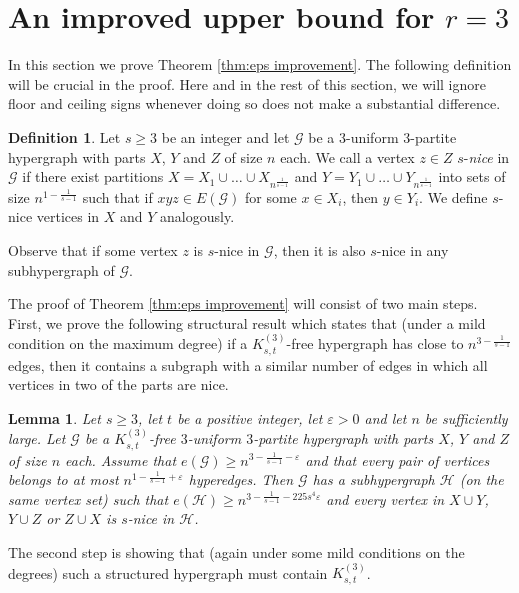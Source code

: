 \documentclass[a4paper,11pt]{article}
\newtheorem{lemma}[theorem]{\bf Lemma}
\theoremstyle{definition}
\newtheorem{definition}[theorem]{\bf Definition}
\def\eps{\varepsilon}
\def\cG{\mathcal{G}}
\def\cH{\mathcal{H}}
\begin{document}
\section{An improved upper bound for $r=3$} \label{sec:improved upper}

In this section we prove Theorem \ref{thm:eps improvement}. The following definition will be crucial in the proof. Here and in the rest of this section, we will ignore floor and ceiling signs whenever doing so does not make a substantial difference.

\begin{definition}
    Let $s\geq 3$ be an integer and let $\cG$ be a 3-uniform 3-partite hypergraph with parts $X$, $Y$ and $Z$ of size $n$ each. We call a vertex $z\in Z$ $s$-\emph{nice} in $\cG$ if there exist partitions $X=X_1\cup \dots \cup X_{n^{\frac{1}{s-1}}}$ and $Y=Y_1\cup \dots \cup Y_{n^{\frac{1}{s-1}}}$ into sets of size $n^{1-\frac{1}{s-1}}$ such that if $xyz\in E(\cG)$ for some $x\in X_i$, then $y\in Y_i$. We define $s$-nice vertices in $X$ and $Y$ analogously.
\end{definition}

Observe that if some vertex $z$ is $s$-nice in $\cG$, then it is also $s$-nice in any subhypergraph of $\cG$.

The proof of Theorem \ref{thm:eps improvement} will consist of two main steps. First, we prove the following structural result which states that (under a mild condition on the maximum degree) if a $K_{s,t}^{(3)}$-free hypergraph has close to $n^{3-\frac{1}{s-1}}$ edges, then it contains a subgraph with a similar number of edges in which all vertices in two of the parts are nice.

\begin{lemma} \label{lem:find structure}
    Let $s\geq 3$, let $t$ be a positive integer, let $\eps>0$ and let $n$ be sufficiently large. Let $\cG$ be a $K_{s,t}^{(3)}$-free $3$-uniform $3$-partite hypergraph with parts $X$, $Y$ and $Z$ of size $n$ each. Assume that $e(\cG)\geq n^{3-\frac{1}{s-1}-\eps}$ and that every pair of vertices belongs to at most $n^{1-\frac{1}{s-1}+\eps}$ hyperedges. Then $\cG$ has a subhypergraph $\cH$ (on the same vertex set) such that $e(\cH)\geq n^{3-\frac{1}{s-1}-225s^4\eps}$ and every vertex in $X\cup Y$, $Y\cup Z$ or $Z\cup X$ is $s$-nice in $\cH$.
\end{lemma}

The second step is showing that (again under some mild conditions on the degrees) such a structured hypergraph must contain $K_{s,t}^{(3)}$.
\end{document}
